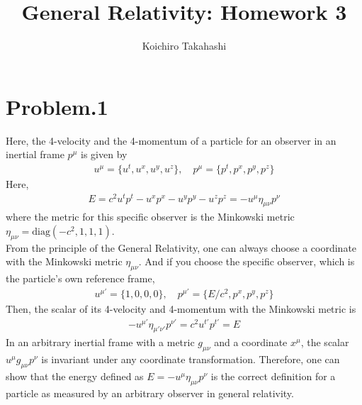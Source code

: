 \documentclass[12pt]{article}
\begin{document}
\title{General Relativity: Homework 3}
\author{Koichiro Takahashi}
\maketitle

\section*{Problem.1}
Here, the 4-velocity and the 4-momentum of a particle for an observer in an inertial frame $p^{\mu}$ is given by
\begin{align*}
u^{\mu} = \{u^{t}, u^{x}, u^{y}, u^{z}  \}, \quad p^{\mu} = \{p^{t}, p^{x}, p^{y}, p^{z}  \}
\end{align*}
Here,
\begin{align*}
E = c^2 u^{t} p^{t} - u^{x} p^{x} - u^{y} p^{y} - u^{z} p^{z} = - u^{\mu} \eta_{\mu \nu} p^{\nu}
\end{align*}
where the metric for this specific observer is the Minkowski metric $\eta_{\mu \nu} = \mathrm{diag}\left(-c^2, 1, 1, 1 \right)$.\\[1em]
From the principle of the General Relativity, one can always choose a coordinate with the Minkowski metric $\eta_{\mu \nu}$. And if you choose the specific observer, which is the particle's own reference frame,
\begin{align*}
u^{\mu'} = \{1, 0, 0, 0 \}, \quad p^{\mu'} = \{E/c^2, p^{x}, p^{y}, p^{z}\}
\end{align*}
Then, the scalar of its 4-velocity and 4-momentum with the Minkowski metric is
\begin{align*}
- u^{\mu'} \eta_{\mu' \nu'} p^{\nu'} = c^2 u^{t'} p^{t'} = E
\end{align*}
In an arbitrary inertial frame with a metric $g_{\mu \nu}$ and a coordinate $x^{\mu}$, the scalar $u^{\mu} g_{\mu \nu} p^{\nu}$ is invariant under any coordinate transformation. Therefore, one can show that the energy defined as $E = - u^{\mu} \eta_{\mu \nu} p^{\nu}$ is the correct definition for a particle as measured by an arbitrary observer in general relativity.
\end{document}
